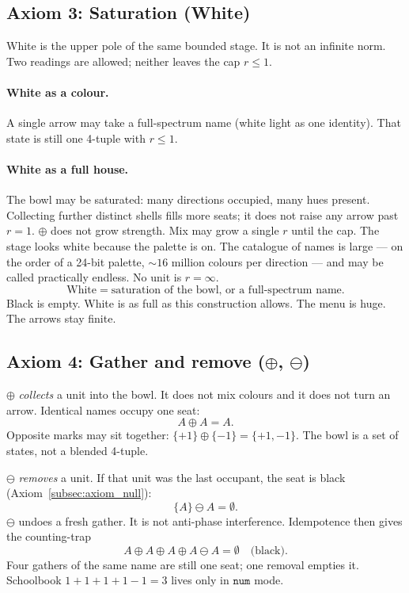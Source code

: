 \documentclass[12pt, a4paper]{article}
\begin{document}
\subsection{Axiom 3: Saturation (White)}
\label{subsec:axiom_white}
White is the upper pole of the same bounded stage. It is not an infinite
norm. Two readings are allowed; neither leaves the cap $r\le 1$.

\paragraph{White as a colour.}
A single arrow may take a full-spectrum name (white light as one
identity). That state is still one 4-tuple with $r\le 1$.

\paragraph{White as a full house.}
The bowl may be saturated: many directions occupied, many hues present.
Collecting further distinct shells fills more seats; it does not raise
any arrow past $r=1$. $\oplus$ does not grow strength. Mix may grow a
single $r$ until the cap. The stage looks white because the palette is on. The catalogue
of names is large --- on the order of a 24-bit palette,
$\sim 16$ million colours per direction --- and may be called
practically endless. No unit is $r=\infty$.
\begin{equation}
    \text{White} \;=\; \text{saturation of the bowl, or a full-spectrum name.}
    \label{eq:white_state}
\end{equation}
Black is empty. White is as full as this construction allows. The
menu is huge. The arrows stay finite.

\subsection{Axiom 4: Gather and remove ($\oplus$, $\ominus$)}
\label{subsec:axiom_idempotence}
$\oplus$ \emph{collects} a unit into the bowl. It does not mix colours
and it does not turn an arrow. Identical names occupy one seat:
\begin{equation}
    A \oplus A = A.
    \label{eq:idempotence_formal}
\end{equation}
Opposite marks may sit together: $\{+1\}\oplus\{-1\}=\{+1,-1\}$.
The bowl is a set of states, not a blended 4-tuple.

$\ominus$ \emph{removes} a unit. If that unit was the last occupant,
the seat is black (Axiom~\ref{subsec:axiom_null}):
\begin{equation}
    \{A\}\ominus A = \emptyset.
    \label{eq:ominus_empty}
\end{equation}
$\ominus$ undoes a fresh gather. It is not anti-phase interference.
Idempotence then gives the counting-trap
\begin{equation}
    A \oplus A \oplus A \oplus A \ominus A = \emptyset
    \quad\text{(black)}.
    \label{eq:four_a_ominus}
\end{equation}
Four gathers of the same name are still one seat; one removal empties
it. Schoolbook $1+1+1+1-1=3$ lives only in $\mathtt{num}$ mode.
\end{document}

